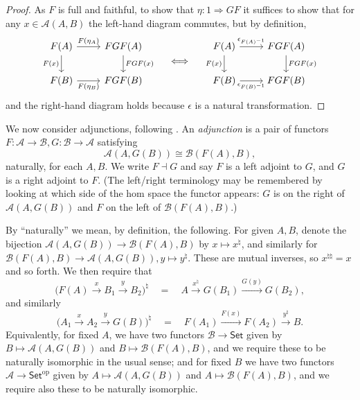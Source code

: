\documentclass[a4paper,11pt]{article}
\theoremstyle{plain}
\theoremstyle{remark}
\newcommand{\mc}[1]{\mathcal{#1}}
\newcommand{\op}{{\operatorname{op}}}
\newcommand{\catSet}{\textsf{Set}}
\begin{document}
\begin{proof}
As $F$ is full and faithful, to show that $\eta \colon 1 \Rightarrow GF$ it suffices to show that for any $x\in\mc A(A,B)$ the left-hand diagram commutes, but by definition,
\[ \begin{tikzcd}
  F(A) \arrow[r, "F(\eta_A)"] \arrow[d, "F(x)"'] & FGF(A) \arrow[d, "FGF(x)"] \\
  F(B) \arrow[r, "F(\eta_B)"'] & FGF(B)
\end{tikzcd} 
\quad\iff\quad
\begin{tikzcd}
  F(A) \arrow[r, "\epsilon_{F(A)^{-1}}"] \arrow[d, "F(x)"'] & FGF(A) \arrow[d, "FGF(x)"] \\
  F(B) \arrow[r, "\epsilon_{F(B)^{-1}}"'] & FGF(B)
\end{tikzcd} 
\]
and the right-hand diagram holds because $\epsilon$ is a natural transformation.
\end{proof}

We now consider adjunctions, following \cite[Chapter~2]{Leinster_BasicCatTheory}.  An \emph{adjunction} is a pair of functors $F\colon\mc A\to\mc B, G\colon\mc B\to\mc A$ satisfying
\[ \mc A(A,G(B)) \cong \mc B(F(A),B), \]
naturally, for each $A,B$.  We write $F \dashv G$ and say $F$ is a left adjoint to $G$, and $G$ is a right adjoint to $F$.  (The left/right terminology may be remembered by looking at which side of the hom space the functor appears: $G$ is on the right of $\mc A(A,G(B))$ and $F$ on the left of $\mc B(F(A),B)$.)

By ``naturally'' we mean, by definition, the following.  For given $A,B$, denote the bijection $\mc A(A,G(B)) \to \mc B(F(A),B)$ by $x \mapsto x^\natural$, and similarly for $\mc B(F(A),B) \to \mc A(A,G(B)), y\mapsto y^\natural$.  These are mutual inverses, so $x^{\natural\natural} = x$ and so forth.  We then require that
\begin{equation} \big( F(A) \xrightarrow{x} B_1 \xrightarrow{y} B_2  \big)^\natural
\quad = \quad
A \xrightarrow{x^\natural} G(B_1) \xrightarrow{G(y)} G(B_2),
\label{eq:nat_im_adj1}
\end{equation}
and similarly
\begin{equation} \big( A_1 \xrightarrow{x} A_2 \xrightarrow{y} G(B) \big)^\natural
\quad = \quad
F(A_1) \xrightarrow{F(x)} F(A_2) \xrightarrow{y^\natural} B.
\label{eq:nat_im_adj2}
\end{equation}
Equivalently, for fixed $A$, we have two functors $\mc B \to \catSet$ given by $B \mapsto \mc A(A,G(B))$ and $B\mapsto \mc B(F(A),B)$, and we require these to be naturally isomorphic in the usual sense; and for fixed $B$ we have two functors $\mc A\to\catSet^\op$ given by $A\mapsto \mc A(A,G(B))$ and $A\mapsto \mc B(F(A),B)$, and we require also these to be naturally isomorphic.
\end{document}
